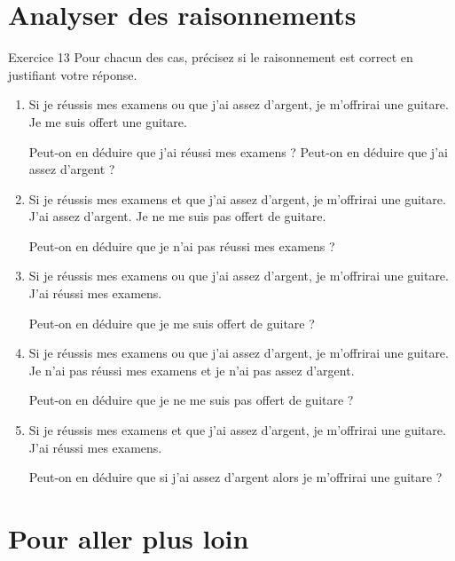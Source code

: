 \documentclass[a4paper,11pt]{article}
\begin{document}
\section{Analyser des raisonnements}

\begin{exercisebox}{Exercice 13}
Pour chacun des cas, précisez si le raisonnement est correct en justifiant votre réponse.

\begin{enumerate}
    \item Si je réussis mes examens ou que j'ai assez d'argent, je m'offrirai une guitare. Je me suis offert une guitare.
    
    Peut-on en déduire que j'ai réussi mes examens ? Peut-on en déduire que j'ai assez d'argent ?
    
    \item Si je réussis mes examens et que j'ai assez d'argent, je m'offrirai une guitare. J'ai assez d'argent. Je ne me suis pas offert de guitare.
    
    Peut-on en déduire que je n'ai pas réussi mes examens ?
    
    \item Si je réussis mes examens ou que j'ai assez d'argent, je m'offrirai une guitare. J'ai réussi mes examens.
    
    Peut-on en déduire que je me suis offert de guitare ?
    
    \item Si je réussis mes examens ou que j'ai assez d'argent, je m'offrirai une guitare. Je n'ai pas réussi mes examens et je n'ai pas assez d'argent.
    
    Peut-on en déduire que je ne me suis pas offert de guitare ?
    
    \item Si je réussis mes examens et que j'ai assez d'argent, je m'offrirai une guitare. J'ai réussi mes examens.
    
    Peut-on en déduire que si j'ai assez d'argent alors je m'offrirai une guitare ?
\end{enumerate}
\end{exercisebox}

\section{Pour aller plus loin}
\end{document}
